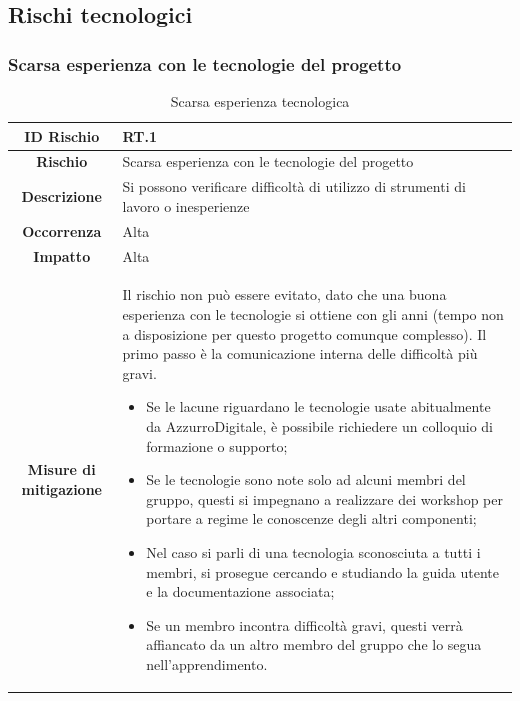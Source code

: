 \documentclass[10pt, a4paper]{article}
\begin{document}

\subsection{Rischi tecnologici}
\subsubsection{Scarsa esperienza con le tecnologie del progetto}

\renewcommand{\arraystretch}{1.5}
\begin{table}[H]
\begin{tabularx}{\textwidth}{c|X}
\textbf{ID Rischio} & RT.1 \\
\hline
\textbf{Rischio} & Scarsa esperienza con le tecnologie del progetto \\
\hline
\textbf{Descrizione} & Si possono verificare difficoltà di utilizzo di strumenti di lavoro o inesperienze\\
\hline
\textbf{Occorrenza} & Alta\\
\hline
\textbf{Impatto} & Alta\\
\hline
\textbf{Misure di mitigazione} & Il rischio non può essere evitato, dato che una buona esperienza con le tecnologie si ottiene con gli anni (tempo non a disposizione per questo progetto comunque complesso). Il primo passo è la comunicazione interna delle difficoltà più gravi.
\begin{itemize}
    \item Se le lacune riguardano le tecnologie usate abitualmente da AzzurroDigitale, è possibile richiedere un colloquio di formazione o supporto;
    \item Se le tecnologie sono note solo ad alcuni membri del gruppo, questi si impegnano a realizzare dei workshop per portare a regime le conoscenze degli altri componenti;
    \item Nel caso si parli di una tecnologia sconosciuta a tutti i membri, si prosegue cercando e studiando la guida utente e la documentazione associata;
    \item Se un membro incontra difficoltà gravi, questi verrà affiancato da un altro membro del gruppo che lo segua nell'apprendimento.
\end{itemize}
\end{tabularx}
\caption{Scarsa esperienza tecnologica}
\end{table}
\end{document}
